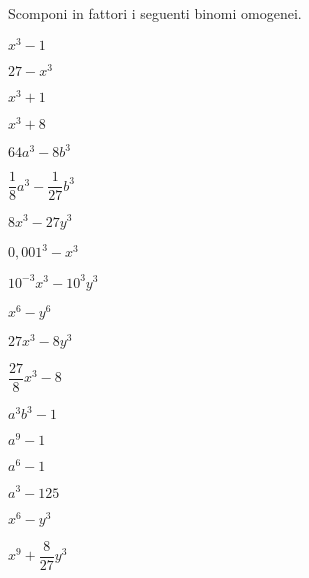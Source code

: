 \begin{esercizio}
\label{ese:17.16}
 Scomponi in fattori i seguenti binomi omogenei.
 \begin{multicols}{3}
 \begin{enumeratea}
  \item $x^{3}-1$
 \item $27-x^{3}$
 \item $x^{3}+1$
 \item $x^{3}+8$
 \item $64a^{3}-8b^{3}$
 \item $\dfrac{1}{8}a^{3}-\dfrac{1}{27}b^{3}$
 \item $8x^{3}-27y^{3}$
 \item $0,001^{3}-x^{3}$
 \item $10^{-3}x^{3}-10^{3}y^{3}$
 \item $x^{6}-y^{6}$
 \item $27x^{3}-8y^{3}$
 \item $\dfrac{27}{8}x^{3}-8$
 \item $a^{3}b^{3}-1$
 \item $a^{9}-1$
 \item $a^{6}-1$
 \item $a^{3}-125$
 \item $x^{6}-y^{3}$
 \item $x^{9}+\dfrac{8}{27}y^{3}$
 \end{enumeratea}
 \end{multicols}
\end{esercizio}


